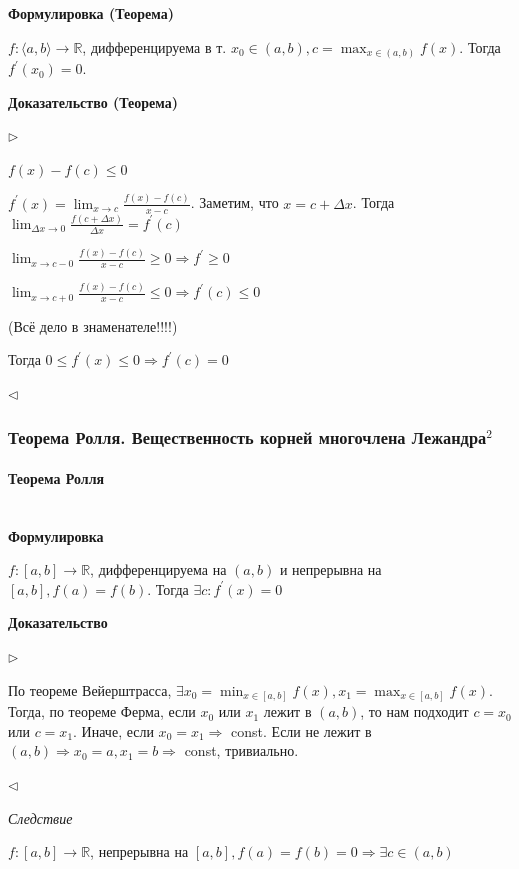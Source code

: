 \documentclass{article}
\let\vanillaparagraph\paragraph
\renewcommand{\paragraph}[1]{\vanillaparagraph{#1}\mbox{}\\}
\begin{document}
\textbf{Формулировка (Теорема)}

$f: \langle a, b \rangle \rightarrow \mathbb{R}$, дифференцируема в т. $x_0 \in (a, b), c = \max_{x \in (a, b)} f(x)$. Тогда $f^\prime(x_0) = 0$.

\textbf{Доказательство (Теорема)}

$\rhd$

$f(x) - f(c) \le 0$

$f^\prime(x) = \lim_{x \rightarrow c}\frac{f(x) - f(c)}{x - c}$. Заметим, что $x = c + \Delta x$. Тогда $\lim_{\Delta x \rightarrow 0}{\frac{f(c + \Delta x)}{\Delta x}} = f^\prime(c)$

$\lim_{x \rightarrow c - 0}\frac{f(x) - f(c)}{x - c} \ge 0 \Rightarrow f^\prime \ge 0$

$\lim_{x \rightarrow c + 0}\frac{f(x) - f(c)}{x - c} \le 0 \Rightarrow f^\prime(c) \le 0$

(Всё дело в знаменателе!!!!)

Тогда $0 \le f^\prime(x) \le 0 \Rightarrow f^\prime(c) = 0$

$\lhd$

\subsubsection{Теорема Ролля. Вещественность корней многочлена Лежандра\texorpdfstring{$^2$}{}}

\paragraph{Теорема Ролля}
\textbf{Формулировка}

$f: [a, b] \rightarrow \mathbb{R}$, дифференцируема на $(a, b)$ и непрерывна на $[a, b], f(a) = f(b)$. Тогда $\exists c: f^\prime(x) = 0$

\textbf{Доказательство}

$\rhd$

По теореме Вейерштрасса, $\exists x_0 = \min_{x \in [a, b]}{f(x)}, x_1 = \max_{x \in [a, b]}{f(x)}$. Тогда, по теореме Ферма, если $x_0$ или $x_1$ лежит в $(a, b)$, то нам подходит $c = x_0$ или $c = x_1$. Иначе, если $x_0 = x_1 \Rightarrow$ const. Если не лежит в $(a, b) \Rightarrow x_0 = a, x_1 = b \Rightarrow$ const, тривиально.

$\lhd$

\textit{Следствие}

$f: [a, b] \rightarrow \mathbb{R}$, непрерывна на $[a, b], f(a) = f(b) = 0 \Rightarrow \exists c \in (a, b)$
\end{document}
